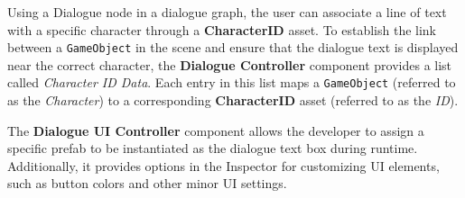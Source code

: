 Using a Dialogue node in a dialogue graph, the user can associate a line of text with a specific character through a \textbf{CharacterID} asset. To establish the link between a \verb|GameObject| in the scene and ensure that the dialogue text is displayed near the correct character, the \textbf{Dialogue Controller} component provides a list called \textit{Character ID Data}. Each entry in this list maps a \verb|GameObject| (referred to as the \textit{Character}) to a corresponding \textbf{CharacterID} asset (referred to as the \textit{ID}).

The \textbf{Dialogue UI Controller} component allows the developer to assign a specific prefab to be instantiated as the dialogue text box during runtime. Additionally, it provides options in the Inspector for customizing UI elements, such as button colors and other minor UI settings.
